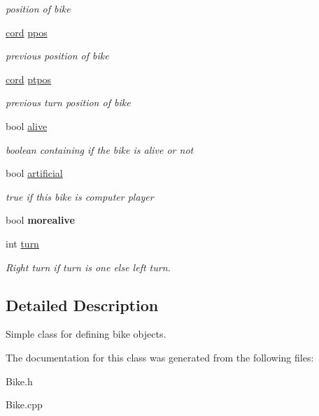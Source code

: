 \begin{DoxyCompactItemize}
\begin{DoxyCompactList}\small\item\em position of bike \end{DoxyCompactList}\item 
\hypertarget{class_bike_a66d1e1fa08942b709cf43b18a5f708b8}{\hyperlink{classcord}{cord} \hyperlink{class_bike_a66d1e1fa08942b709cf43b18a5f708b8}{ppos}}\label{class_bike_a66d1e1fa08942b709cf43b18a5f708b8}

\begin{DoxyCompactList}\small\item\em previous position of bike \end{DoxyCompactList}\item 
\hypertarget{class_bike_ac5b404a64f9c893e6197509fa8f9b574}{\hyperlink{classcord}{cord} \hyperlink{class_bike_ac5b404a64f9c893e6197509fa8f9b574}{ptpos}}\label{class_bike_ac5b404a64f9c893e6197509fa8f9b574}

\begin{DoxyCompactList}\small\item\em previous turn position of bike \end{DoxyCompactList}\item 
\hypertarget{class_bike_a856ccfba4773cb502f20543988c3be28}{bool \hyperlink{class_bike_a856ccfba4773cb502f20543988c3be28}{alive}}\label{class_bike_a856ccfba4773cb502f20543988c3be28}

\begin{DoxyCompactList}\small\item\em boolean containing if the bike is alive or not \end{DoxyCompactList}\item 
\hypertarget{class_bike_a6a23b626c27e70d7df7d4ba33acd8153}{bool \hyperlink{class_bike_a6a23b626c27e70d7df7d4ba33acd8153}{artificial}}\label{class_bike_a6a23b626c27e70d7df7d4ba33acd8153}

\begin{DoxyCompactList}\small\item\em true if this bike is computer player \end{DoxyCompactList}\item 
\hypertarget{class_bike_a60962e91ae810aa778bab17257e0f3e4}{bool {\bfseries morealive}}\label{class_bike_a60962e91ae810aa778bab17257e0f3e4}

\item 
\hypertarget{class_bike_a7c2901ac61d1e3d82ad4765473b8e556}{int \hyperlink{class_bike_a7c2901ac61d1e3d82ad4765473b8e556}{turn}}\label{class_bike_a7c2901ac61d1e3d82ad4765473b8e556}

\begin{DoxyCompactList}\small\item\em Right turn if turn is one else left turn. \end{DoxyCompactList}\end{DoxyCompactItemize}


\subsection{Detailed Description}
Simple class for defining bike objects. 

The documentation for this class was generated from the following files\-:\begin{DoxyCompactItemize}
\item 
Bike.\-h\item 
Bike.\-cpp\end{DoxyCompactItemize}
